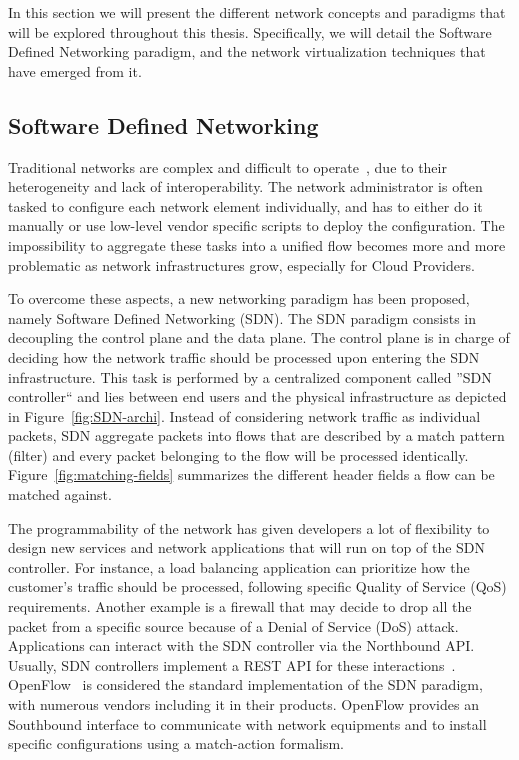 In this section we will present the different network concepts and paradigms that will be explored throughout this thesis.
Specifically, we will detail the Software Defined Networking paradigm, and the network virtualization techniques that have emerged from it.

\subsection{Software Defined Networking}

Traditional networks are complex and difficult to operate~\cite{complexnetworks}, due to their heterogeneity and lack of interoperability. The network administrator is often tasked to configure each network element individually, and has to either do it manually or use low-level vendor specific scripts to deploy the configuration. The impossibility to aggregate these tasks into a unified flow becomes more and more problematic as network infrastructures grow, especially for Cloud Providers.

To overcome these aspects, a new networking paradigm has been proposed, namely Software Defined Networking (SDN).
The SDN paradigm consists in decoupling the control plane and the data plane.
The control plane is in charge of deciding how the network traffic should be processed upon entering the SDN infrastructure.
This task is performed by a centralized component called ''SDN controller`` and lies between end users and the physical infrastructure as depicted in Figure~\ref{fig:SDN-archi}. Instead of considering network traffic as individual packets, SDN aggregate packets into flows that are described by a match pattern (filter) and every packet belonging to the flow will be processed identically. Figure~\ref{fig:matching-fields} summarizes the different header fields a flow can be matched against.



The programmability of the network has given developers a lot of flexibility to design new services and network applications that will run on top of the SDN controller.
For instance, a load balancing application can prioritize how the customer's traffic should be processed, following specific Quality of Service (QoS) requirements.
Another example is a firewall that may decide to drop all the packet from a specific source because of a Denial of Service (DoS) attack.
Applications can interact with the SDN controller via the Northbound API.
Usually, SDN controllers implement a REST API for these interactions~\cite{onos-Berde2014a,opendaylight,floodlight}.
OpenFlow~\cite{Openflow-McKeown2008} is considered the standard implementation of the SDN paradigm, with numerous vendors including it in their products.
OpenFlow provides an Southbound interface to communicate with network equipments and to install specific configurations using a match-action formalism.

